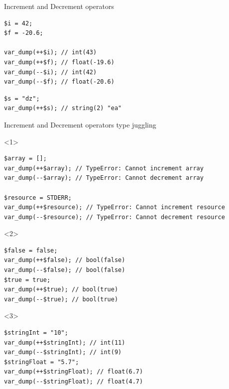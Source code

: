 \documentclass[aspectratio=169]{beamer}
\begin{document}
\begin{frame}[fragile]{Increment and Decrement operators}
    \begin{verbatim}
$i = 42;
$f = -20.6;

var_dump(++$i); // int(43)
var_dump(++$f); // float(-19.6)
var_dump(--$i); // int(42)
var_dump(--$f); // float(-20.6)
    \end{verbatim}
    \pause
    \begin{verbatim}
$s = "dz";
var_dump(++$s); // string(2) "ea"
    \end{verbatim}
\end{frame}
\begin{frame}[fragile]{Increment and Decrement operators type juggling}
    \begin{onlyenv}<1>
        \begin{verbatim}
$array = [];
var_dump(++$array); // TypeError: Cannot increment array
var_dump(--$array); // TypeError: Cannot decrement array

$resource = STDERR;
var_dump(++$resource); // TypeError: Cannot increment resource
var_dump(--$resource); // TypeError: Cannot decrement resource
        \end{verbatim}
    \end{onlyenv}
    \begin{onlyenv}<2>
        \begin{verbatim}
$false = false;
var_dump(++$false); // bool(false)
var_dump(--$false); // bool(false)
$true = true;
var_dump(++$true); // bool(true)
var_dump(--$true); // bool(true)
        \end{verbatim}
    \end{onlyenv}
    \begin{onlyenv}<3>
        \begin{verbatim}
$stringInt = "10";
var_dump(++$stringInt); // int(11)
var_dump(--$stringInt); // int(9)
$stringFloat = "5.7";
var_dump(++$stringFloat); // float(6.7)
var_dump(--$stringFloat); // float(4.7)
        \end{verbatim}
    \end{onlyenv}
\end{frame}
\end{document}
